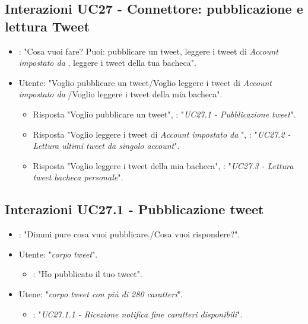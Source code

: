 \subsection{Interazioni UC27 - Connettore: pubblicazione e lettura Tweet}
\label{sec:connettore_twitter}
 \begin{itemize}
        \item {}: "Cosa vuoi fare? Puoi: pubblicare un tweet, leggere i tweet di {\it Account impostato da }, leggere i tweet della tua bacheca".
        \item Utente: "Voglio pubblicare un tweet/Voglio leggere i tweet di {\it Account impostato da }/Voglio leggere i tweet della mia bacheca".
        \begin{itemize}
         \item{Risposta "Voglio pubblicare un tweet"}, : "{\it UC27.1 - Pubblicazione tweet}".
         \item{Risposta "Voglio leggere i tweet di {\it Account impostato da }"}, : "{\it UC27.2 - Lettura ultimi tweet da singolo account}".
         \item{Risposta "Voglio leggere i tweet della mia bacheca"}, : "{\it UC27.3 - Lettura tweet bacheca personale}".
         \end{itemize}
    \end{itemize}


\subsection{Interazioni UC27.1 - Pubblicazione tweet}
\label{sec:connettore_twitter_scrittura}
\begin{itemize}
        \item {}: "Dimmi pure cosa vuoi pubblicare./Cosa vuoi rispondere?".
        \item Utente: "{\it corpo tweet}".
        \begin{itemize}
        \item {}: "Ho pubblicato il tuo tweet".
           \end{itemize}
        \item Utene: "{\it corpo tweet con più di 280 caratteri}".
           \begin{itemize}
        \item {}: "{\it UC27.1.1 - Ricezione notifica fine caratteri disponibili}".
           \end{itemize}
        
    \end{itemize}



